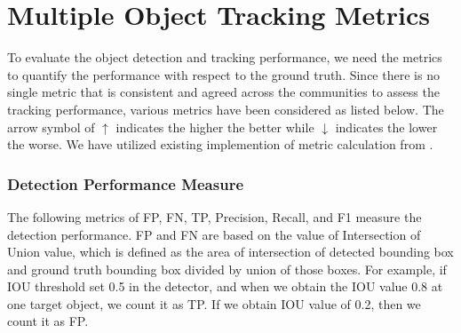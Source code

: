 \section{Multiple Object Tracking Metrics}
\label{sec:background/section_d}

To evaluate the object detection and tracking performance, we need the metrics to quantify the performance with respect to the ground truth. Since there is no single metric that is consistent and agreed across the communities to assess the tracking performance, various metrics have been considered as listed below. The arrow symbol of $\uparrow$ indicates the higher the better while $\downarrow$ indicates the lower the worse. We have utilized existing implemention of metric calculation from \cite{heindl_cheindpy-motmetrics_2021}. 

\subsubsection{Detection Performance Measure}
The following metrics of FP, FN, TP, Precision, Recall, and F1 measure the detection performance. FP and FN are based on the value of Intersection of Union value, which is defined as the area of intersection of detected bounding box and ground truth bounding box divided by union of those boxes. For example, if IOU threshold set 0.5 in the detector, and when we obtain the IOU value 0.8 at one target object, we count it as TP. If we obtain IOU value of 0.2, then we count it as FP.


